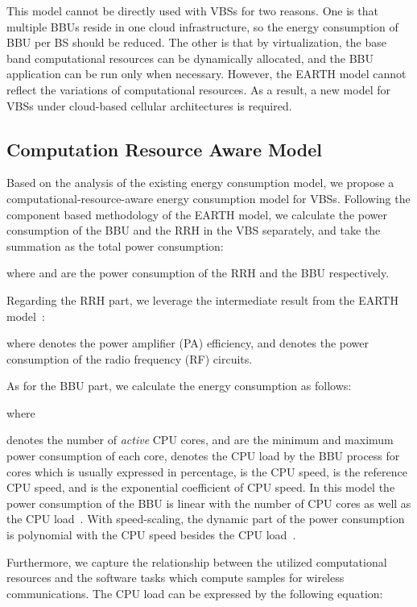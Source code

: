 \documentclass[conference]{IEEEtran}
\begin{document}
This model cannot be directly used with VBSs for two reasons.
One is that multiple BBUs reside in one cloud infrastructure,
so the energy consumption of BBU per BS should be reduced.  The
other is that by virtualization, the base band computational resources can be
dynamically allocated, and the BBU application can be run only when
necessary. However, the EARTH model cannot reflect the variations of
computational resources. As a result, a new
model for VBSs under cloud-based cellular architectures
is required.

\subsection{Computation Resource Aware Model}

Based on the analysis of the existing energy consumption model, we propose a
computational-resource-aware energy consumption model for VBSs.
Following the component based methodology of the EARTH model, we
calculate the power consumption of the BBU and the RRH in the VBS separately,
and take the summation as the total power consumption:

where  and  are the power consumption of the RRH and the BBU respectively.

Regarding the RRH part, we leverage the intermediate
result from the EARTH model~\cite{auer2011howmuch}:

where  denotes the power amplifier (PA) efficiency,
and  denotes the
power consumption of the radio frequency (RF) circuits.

As for the BBU part, we calculate the energy consumption as follows:

where

 denotes the number of \emph{active} CPU cores,
 and  are the minimum and maximum power consumption of
each core,
 denotes the CPU load by the BBU process for 
cores which is usually expressed in percentage,
 is the CPU speed,
 is the reference CPU speed,
and  is the exponential coefficient of CPU speed.
In this model
the power consumption of the BBU is linear with the number of CPU cores as well as
the CPU load~\cite{blackburn2008five,vasan2010worth}.
With speed-scaling, the dynamic part of the power
consumption is polynomial with the CPU speed besides the CPU
load~\cite{son2012speedbalance}.

Furthermore, we capture the relationship between the utilized computational
resources and the software tasks which compute samples for wireless
communications.
The CPU load can be expressed by the following equation:
\end{document}
